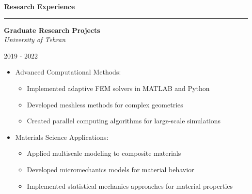 \documentclass[11pt]{article}  %
\newenvironment{rSection}[1]{  %
    \vspace{0.5em}  %
    {\Large\bfseries\color{primary} #1}  %
    \vspace{0.3em}  %
    {\color{primary}\hrule height 2pt}  %
    \vspace{0.3em}  %
}{
    \vspace{0.05em}  %
}
\newenvironment{rSubsection}[4]{  %
    \vspace{0.1em}  %
    \begin{minipage}[t]{0.8\textwidth}  %
        \raggedright  %
        \textbf{#1} \\ \textit{\color{lighttext}#3}  %
    \end{minipage}%
    \hfill%
    \begin{minipage}[t]{0.2\textwidth}  %
        \raggedleft  %
        \color{lighttext}#2 \\ \textit{\color{lighttext}#4}  %
    \end{minipage}
    \vspace{-0.2em}  %
    \begin{itemize}[leftmargin=*,labelsep=0.4em,topsep=0pt,partopsep=0pt,parsep=0pt,itemsep=0.1em]  %
}{
    \end{itemize}
    \vspace{0.1em}  %
}
\begin{document}
\begin{rSection}{Research Experience}
        \begin{rSubsection}{\color{primary}Graduate Research Projects}{2019 - 2022}{University of Tehran}{}  %
            \item Advanced Computational Methods:  %
            \vspace{0.3em}
            \begin{itemize}[leftmargin=*,labelsep=0.5em]  %
                \item \small Implemented adaptive FEM solvers in MATLAB and Python  %
                \item \small Developed meshless methods for complex geometries  %
                \item \small Created parallel computing algorithms for large-scale simulations  %
                \end{itemize}
            \vspace{0.3em}
            \item Materials Science Applications:  %
            \vspace{0.3em}
            \begin{itemize}[leftmargin=*,labelsep=0.5em]  %
                \item \small Applied multiscale modeling to composite materials  %
                \item \small Developed micromechanics models for material behavior  %
                \item \small Implemented statistical mechanics approaches for material properties  %
                \end{itemize}
            \end{rSubsection}
\end{rSection}
\end{document}
